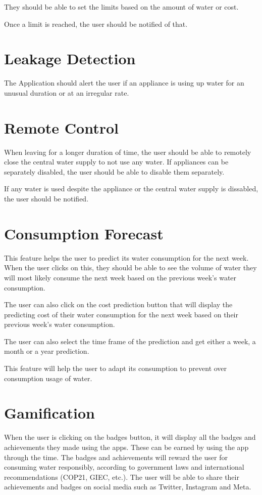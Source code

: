 \documentclass[10pt]{article}
\begin{document}
They should be able to set the limits based on the amount of water or cost.

Once a limit is reached, the user should be notified of that.

\section{Leakage Detection}
The Application should alert the user if an appliance is using up water for an unusual duration or at an irregular rate.

\section{Remote Control}
When leaving for a longer duration of time, the user should be able to remotely close the central water supply to not use any water. If appliances can be separately disabled, the user should be able to disable them separately.

If any water is used despite the appliance or the central water supply is dissabled, the user should be notified.

\section{Consumption Forecast}
This feature helps the user to predict its water consumption for the next week. When the user clicks on this, they should be able to see the volume of water they will most likely consume the next week based on the previous week's water consumption.

The user can also click on the cost prediction button that will display the predicting cost of their water consumption for the next week based on their previous week's water consumption.

The user can also select the time frame of the prediction and get either a week, a month or a year prediction.

This feature will help the user to adapt its consumption to prevent over consumption usage of water.

\section{Gamification}
When the user is clicking on the badges button, it will display all the badges and achievements they made using the apps. These can be earned by using the app through the time. The badges and achievements will reward the user for consuming water responsibly, according to government laws and international recommendations (COP21, GIEC, etc.). The user will be able to share their achievements and badges on social media such as Twitter, Instagram and Meta.
\end{document}
